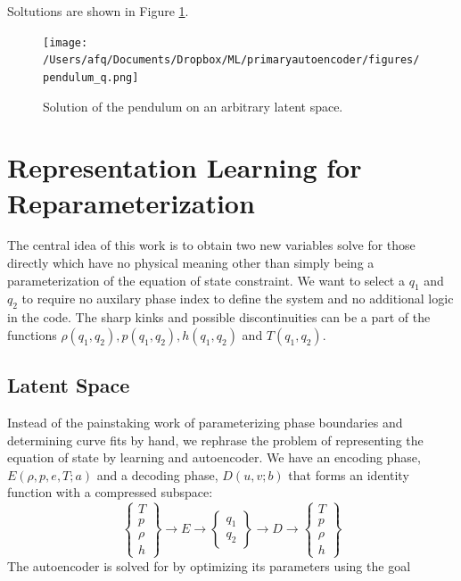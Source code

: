 \documentclass[]{article}
\begin{document}
Soltutions are shown in Figure \ref{fig:pendulum}.
\begin{figure}
\centering
\texttt{[image: /Users/afq/Documents/Dropbox/ML/primaryautoencoder/figures/pendulum\_q.png]}
\caption{\label{fig:pendulum}Solution of the pendulum on an arbitrary latent space.}
\end{figure}

\hypertarget{header-n3294}{%
\section{Representation Learning for
Reparameterization}\label{header-n3294}}

The central idea of this work is to obtain two new variables solve for
those directly which have no physical meaning other than simply being a
parameterization of the equation of state constraint. We want to select a
\(q_1\) and \(q_2\) to require no auxilary phase index to define the system
and no additional logic in the code. The sharp kinks and possible
discontinuities can be a part of the functions
\(\rho(q_1, q_2), p(q_1, q_2), h(q_1, q_2)\) and \(T(q_1, q_2)\).


\hypertarget{header-n3299}{%
\subsection{Latent Space}\label{header-n3299}}

Instead of the painstaking work of parameterizing phase boundaries and
determining curve fits by hand, we rephrase the problem of representing
the equation of state by learning and autoencoder. We have an encoding
phase, \(E(\rho,p,e,T; a)\) and a decoding phase, \(D(u,v; b)\) that
forms an identity function with a compressed subspace:
\begin{equation}
\left\{ \begin{array}{c}
T\\ p\\ \rho\\ h
\end{array}\right\} \rightarrow  E \rightarrow 
\left\{ \begin{array}{c} q_1\\q_2 \end{array} \right\}\rightarrow D \rightarrow 
\left\{ \begin{array}{c}
T\\ p\\ \rho\\ h
\end{array}\right\}
\end{equation}
The autoencoder is solved for by optimizing its parameters using the
goal
\end{document}
